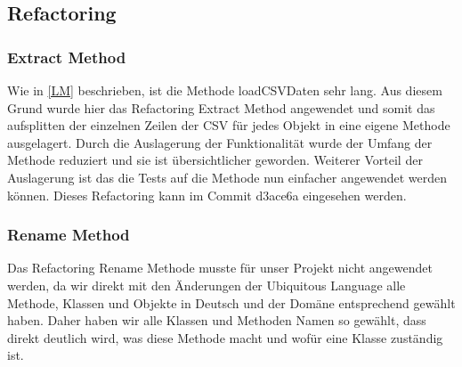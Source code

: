 \subsection{Refactoring}
\subsubsection{Extract Method}
Wie in \autoref{LM} beschrieben, ist die Methode loadCSVDaten sehr lang. Aus diesem Grund wurde hier das Refactoring Extract Method angewendet und somit das aufsplitten der einzelnen Zeilen der CSV für jedes Objekt in eine eigene Methode ausgelagert.
Durch die Auslagerung der Funktionalität wurde der Umfang der Methode reduziert und sie ist übersichtlicher geworden. 
Weiterer Vorteil der Auslagerung ist das die Tests auf die Methode nun einfacher angewendet werden können. 
Dieses Refactoring kann im Commit d3ace6a eingesehen werden.
\subsubsection{Rename Method}
Das Refactoring Rename Methode musste für unser Projekt nicht angewendet werden, da wir direkt mit den Änderungen der Ubiquitous Language alle Methode, Klassen und Objekte in Deutsch und der Domäne entsprechend gewählt haben. Daher haben wir alle Klassen und Methoden Namen so gewählt, dass direkt deutlich wird, was diese Methode macht und wofür eine Klasse zuständig ist.
